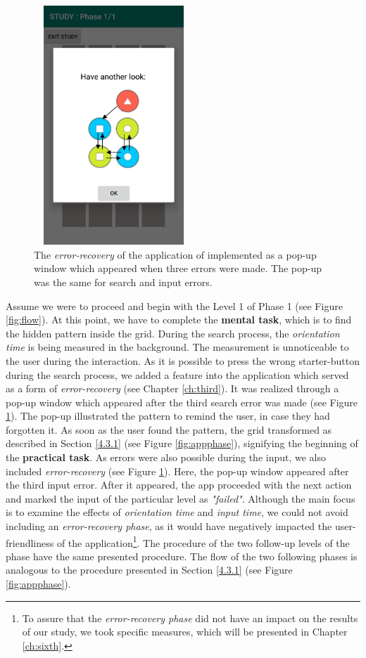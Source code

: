 \begin{figure}[t!]
\centering
\includegraphics[width=6cm, height=9cm]{Chapters/graphics/error.jpg}
\caption{The \textit{error-recovery} of the application of implemented as a pop-up window which appeared when three errors were made. The pop-up was the same for search and input errors.}
\label{fig:errorpopup}
\end{figure}

Assume we were to proceed and begin with the Level 1 of Phase 1 (see Figure \ref{fig:flow}). At this point, we have to complete the \textbf{mental task}, which is to find the hidden pattern inside the grid. During the search process, the \textit{orientation time} is being measured in the background. The measurement is unnoticeable to the user during the interaction. As it is possible to press the wrong starter-button during the search process, we added a feature into the application which served as a form of \textit{error-recovery} (see Chapter \ref{ch:third}). It was realized through a pop-up window which appeared after the third search error was made (see Figure \ref{fig:errorpopup}). The pop-up illustrated the pattern to remind the user, in case they had forgotten it. As soon as the user found the pattern, the grid transformed as described in Section \ref{4.3.1} (see Figure \ref{fig:appphase}), signifying the beginning of the \textbf{practical task}. As errors were also possible during the input, we also included \textit{error-recovery} (see Figure \ref{fig:errorpopup}). Here, the pop-up window appeared after the third input error. After it appeared, the app proceeded with the next action and marked the input of the particular level as \textit{"failed"}. Although the main focus is to examine the effects of \textit{orientation time} and \textit{input time}, we could not avoid including an \textit{error-recovery phase}, as it would have negatively impacted the user-friendliness of the application\footnote{To assure that the \textit{error-recovery phase} did not have an impact on the results of our study, we took specific measures, which will be presented in Chapter \ref{ch:sixth}.}. The procedure of the two follow-up levels of the phase have the same presented procedure. The flow of the two following phases is analogous to the procedure presented in Section \ref{4.3.1} (see Figure \ref{fig:appphase}).  \\





